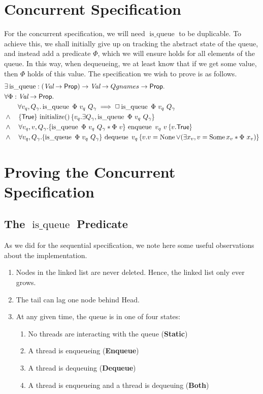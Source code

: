 \documentclass[twoside,11pt,openright]{report}
\newcommand{\initialise}{\operatorname{initialize}}
\newcommand{\enqueue}{\operatorname{enqueue}}
\newcommand{\dequeue}{\operatorname{dequeue}}
\newcommand{\isqueue}{\operatorname{is\_queue}}
\newcommand{\StaticState}{\textbf{Static}}
\newcommand{\EnqueueState}{\textbf{Enqueue}}
\newcommand{\DequeueState}{\textbf{Dequeue}}
\newcommand{\BothState}{\textbf{Both}}
\begin{document}
\section{Concurrent Specification}
For the concurrent specification, we will need $\isqueue$ to be duplicable. To achieve this, we shall initially give up on tracking the abstract state of the queue, and instead add a predicate $\Phi$, which we will ensure holds for all elements of the queue. In this way, when dequeueing, we at least know that if we get some value, then $\Phi$ holds of this value. The specification we wish to prove is as follows.
\begin{align*}
  &\exists \isqueue : (\Val \to \Prop) \to \Val \to Qgnames \to \Prop.\\
  &\forall \Phi : \Val \to \Prop.\\
  &\quad\quad \forall v_q, Q_\gname . \isqueue \ \Phi \ v_q \ Q_\gname \implies \persistently \isqueue \ \Phi \ v_q \ Q_\gname\\
  &\land\quad\hoare{\TRUE}{\initialise \TT}{v_q . \exists Q_\gname, \isqueue\ \Phi \ v_q \ Q_\gname}\\
  &\land\quad\forall v_q, v, Q_\gname. \hoare{\isqueue \ \Phi \ v_q \ Q_\gname \ast \Phi \ v}{\enqueue\ v_q\ v}{v . \TRUE}\\
  &\land\quad\forall v_q, Q_\gname. \hoare{\isqueue \ \Phi \ v_q \ Q_\gname}{\dequeue\ v_q}{v . v = \None \lor (\exists x_v, v = \Some x_v \ast \Phi \ x_v)}
\end{align*}

\section{Proving the Concurrent Specification}
\subsection[The isqueue predicate]{The $\isqueue$ Predicate}
As we did for the sequential specification, we note here some useful observations about the implementation.
\begin{enumerate}
  \item\label{MSQTL:insights:oldnodes} Nodes in the linked list are never deleted. Hence, the linked list only ever grows.
  \item\label{MSQTL:insights:lag} The tail can lag one node behind Head.
  \item\label{MSQTL:insights:states} At any given time, the queue is in one of four states:
    \begin{enumerate}
      \item\label{MSQTL:insights:state:static} No threads are interacting with the queue (\StaticState)
      \item\label{MSQTL:insights:state:enqueue} A thread is enqueueing (\EnqueueState)
      \item\label{MSQTL:insights:state:dequeue} A thread is dequeuing (\DequeueState)
      \item\label{MSQTL:insights:state:both} A thread is enqueueing and a thread is dequeuing (\BothState)
    \end{enumerate}
\end{enumerate}
\end{document}
